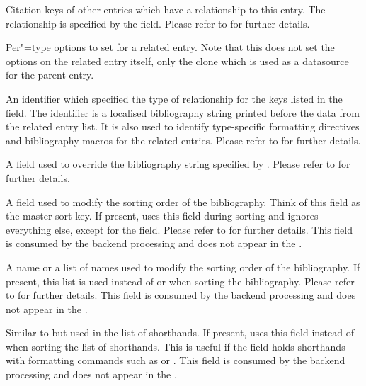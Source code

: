\documentclass{ltxdockit}[2011/03/25]
\newcommand*{\biblatex}{\sty{biblatex}\xspace}
\begin{document}
\begin{fieldlist}

Citation keys of other entries which have a relationship to this entry. The relationship is specified by the  field. Please refer to  for further details.


Per"=type options to set for a related entry. Note that this does not set the options on the related entry itself, only the  clone which is used as a datasource for the parent entry.


An identifier which specified the type of relationship for the keys listed in the  field. The identifier is a localised bibliography string printed
before the data from the related entry list. It is also used to identify type-specific
formatting directives and bibliography macros for the related entries. Please refer to  for further details.


A field used to override the bibliography string specified by . Please refer to  for further details.


A field used to modify the sorting order of the bibliography. Think of this field as the master sort key. If present, \biblatex uses this field during sorting and ignores everything else, except for the  field. Please refer to  for further details. This field is consumed by the backend processing and does not appear in the .


A name or a list of names used to modify the sorting order of the bibliography. If present, this list is used instead of  or  when sorting the bibliography. Please refer to  for further details. This field is consumed by the backend processing and does not appear in the .


Similar to  but used in the list of shorthands. If present, \biblatex uses this field instead of  when sorting the list of shorthands. This is useful if the  field holds shorthands with formatting commands such as  or . This field is consumed by the backend processing and does not appear in the .


\end{fieldlist}
\end{document}
